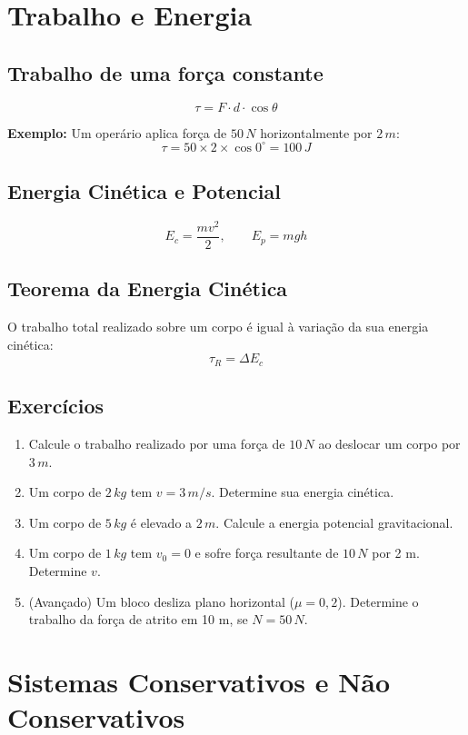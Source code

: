 \documentclass[a4paper,12pt]{article}
\begin{document}
\section{Trabalho e Energia}

\subsection{Trabalho de uma força constante}
\[
\tau = F \cdot d \cdot \cos\theta
\]

\textbf{Exemplo:} Um operário aplica força de $50\,N$ horizontalmente por $2\,m$:
\[
\tau = 50 \times 2 \times \cos0^\circ = 100\,J
\]

\subsection{Energia Cinética e Potencial}
\[
E_c = \frac{mv^2}{2}, \qquad E_p = mgh
\]

\subsection{Teorema da Energia Cinética}
O trabalho total realizado sobre um corpo é igual à variação da sua energia cinética:
\[
\tau_R = \Delta E_c
\]

\subsection{Exercícios}
\begin{enumerate}
\item Calcule o trabalho realizado por uma força de $10\,N$ ao deslocar um corpo por $3\,m$.
\item Um corpo de $2\,kg$ tem $v=3\,m/s$. Determine sua energia cinética.
\item Um corpo de $5\,kg$ é elevado a $2\,m$. Calcule a energia potencial gravitacional.
\item Um corpo de $1\,kg$ tem $v_0=0$ e sofre força resultante de $10\,N$ por 2 m. Determine $v$.
\item (Avançado) Um bloco desliza plano horizontal ($\mu=0{,}2$). Determine o trabalho da força de atrito em 10 m, se $N=50\,N$.
\end{enumerate}

\section{Sistemas Conservativos e Não Conservativos}
\end{document}
